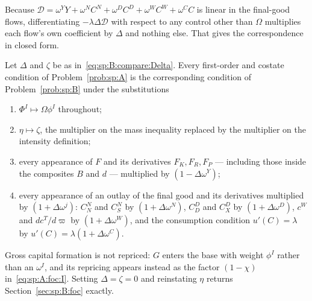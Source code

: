 Because $\mathcal D=\omega^YY+\omega^NC^N+\omega^DC^D+\omega^WC^W+\omega^CC$ is linear in the
final-good flows, differentiating $-\lambda\Delta\mathcal D$ with respect to any control other than
$\Omega$ multiplies each flow's own coefficient by $\Delta$ and nothing else. That gives the
correspondence in closed form.

\begin{proposition}\label{prop:sp:compare:map}
Let $\Delta$ and $\zeta$ be as in~\eqref{eq:sp:B:compare:Delta}. Every first-order and costate
condition of Problem~\ref{prob:sp:A} is the corresponding condition of Problem~\ref{prob:sp:B} under
the substitutions
\begin{enumerate}[label=(\roman*),leftmargin=2.2em,itemsep=0.15em]
\item $\Phi^I\mapsto\Omega\phi^I$ throughout;
\item $\eta\mapsto\zeta$, the multiplier on the mass inequality replaced by the multiplier on the
intensity definition;
\item every appearance of $F$ and its derivatives $F_K,F_R,F_P$ --- including those inside the
composites $B$ and $d$ --- multiplied by $\left(1-\Delta\omega^Y\right)$;
\item every appearance of an outlay of the final good and its derivatives multiplied by
$\left(1+\Delta\omega^j\right)$: $C^N_N$ and $C^N_S$ by $\left(1+\Delta\omega^N\right)$, $C^D_D$ and
$C^D_X$ by $\left(1+\Delta\omega^D\right)$, $c^W$ and $dc^T/d\varpi$ by
$\left(1+\Delta\omega^W\right)$, and the consumption condition $u'(C)=\lambda$ by
$u'(C)=\lambda\left(1+\Delta\omega^C\right)$.
\end{enumerate}
Gross capital formation is not repriced: $G$ enters the base with weight $\phi^I$ rather than an
$\omega^I$, and its repricing appears instead as the factor $\left(1-\chi\right)$
in~\eqref{eq:sp:A:foc:I}. Setting $\Delta=\zeta=0$ and reinstating $\eta$ returns
Section~\ref{sec:sp:B:foc} exactly.
\end{proposition}

